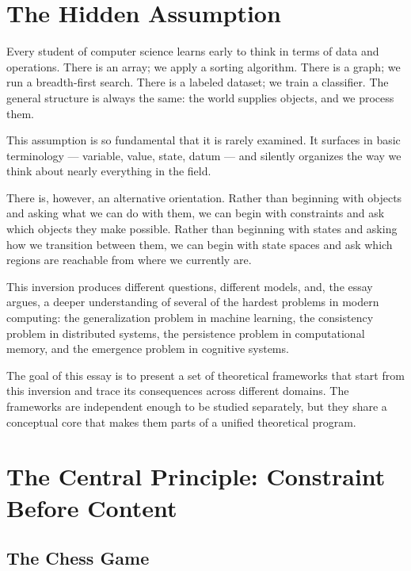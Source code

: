 \documentclass[11pt, a4paper]{article}
\theoremstyle{named}
\begin{document}
\newpage
\tableofcontents
\newpage

\section{The Hidden Assumption}

Every student of computer science learns early to think in terms of
data and operations. There is an array; we apply a sorting algorithm.
There is a graph; we run a breadth-first search. There is a labeled
dataset; we train a classifier. The general structure is always the
same: the world supplies objects, and we process them.

This assumption is so fundamental that it is rarely examined. It
surfaces in basic terminology --- variable, value, state, datum ---
and silently organizes the way we think about nearly everything in
the field.

There is, however, an alternative orientation. Rather than beginning
with objects and asking what we can do with them, we can begin with
constraints and ask which objects they make possible. Rather than
beginning with states and asking how we transition between them, we
can begin with state spaces and ask which regions are reachable from
where we currently are.

This inversion produces different questions, different models, and,
the essay argues, a deeper understanding of several of the hardest
problems in modern computing: the generalization problem in machine
learning, the consistency problem in distributed systems, the
persistence problem in computational memory, and the emergence problem
in cognitive systems.

The goal of this essay is to present a set of theoretical frameworks
that start from this inversion and trace its consequences across
different domains. The frameworks are independent enough to be studied
separately, but they share a conceptual core that makes them parts of
a unified theoretical program.

\section{The Central Principle: Constraint Before Content}

\subsection{The Chess Game}
\end{document}
